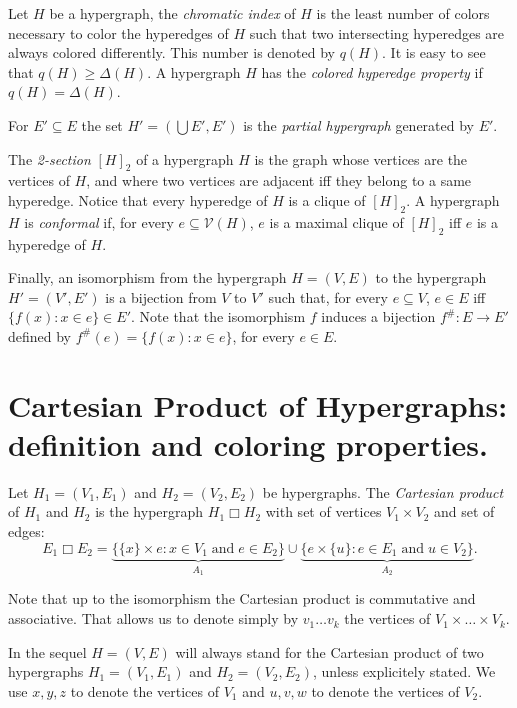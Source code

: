 \documentclass[copyright]{eptcs}
\newcommand{\mc}[1]{\mathcal{#1}}
\newcommand{\suppr}[1]{}
\begin{document}
Let $H$ be a hypergraph, the \emph{chromatic index} of $H$ is the least number of colors necessary to color the hyperedges of $H$ such that two intersecting hyperedges are always colored differently. This number is denoted by $q(H)$. It is easy to see that $q(H) \geq \Delta(H)$. A hypergraph $H$ has the \emph{colored hyperedge property} if  $q(H) = \Delta(H)$.

For $E'\subseteq E$ the set $H'= (\bigcup E' , E')$ is the \emph{partial hypergraph} generated by $E'$. 

The \emph{2-section} $[H]_2$ of a hypergraph $H$ is the graph
whose vertices are the vertices of $H$, and where two vertices are
adjacent iff they belong to a same hyperedge. Notice that every
hyperedge of $H$ is a clique of $[H]_2$. A hypergraph $H$ is
\emph{conformal} if, for every $e\subseteq \mc V(H)$, $e$ is a
maximal clique of $[H]_2$ iff $e$ is a hyperedge of $H$.

Finally, an isomorphism from the hypergraph $H=(V,E)$ to the
hypergraph $H'=(V',E')$ is a bijection from $V$ to $V'$ such that,
for every $e \subseteq V$, $e \in E$ iff $\{f(x) : x \in e\} \in
E'$. Note that the isomorphism $f$ induces a bijection $f^{\#} : E
\rightarrow E'$ defined by $f^{\#}(e) = \{f(x) : x \in e\}$, for
every $e\in E$.

\section{Cartesian Product of  Hypergraphs: definition and coloring properties.}

Let $H_1=(V_1, E_1)$ and  $H_2=(V_2, E_2)$
be hypergraphs. The \emph{Cartesian product} of $H_1$ and $H_2$ is the hypergraph $H_1 \Box H_2$ with set of vertices
$V_1 \times V_2$ and set of edges:
\[
 E_1\Box E_2= \underbrace{\{ \{x\}\times e : x\in V_1 \;\mbox{and}\;  e\in E_2\}}_{A_{1}} \cup\underbrace{ \{e\times
 \{u\}: e\in E_1 \; \mbox{and}\;  u\in V_2\}}_{A_{2}}.
\]

Note that up to the isomorphism the Cartesian product is
commutative and associative. That allows us to denote simply by
$v_1 \ldots v_k$ the vertices of $V_1 \times \ldots \times V_k$.
\suppr{SE REPETE AVEC LA PREUVE DU LEMME Note also that a
hyperedge $\{x\} \times e$ of $A_1$ and a hyperedge $e' \times
\{u\}$ of $A_2$ have a non-empty intersection iff $x \in e'$ and
$u\in e$. In that case $\{x\} \times e \cap e' \times \{u\}=
\{xu\}$.}


In the sequel $H=(V,E)$ will always stand for the Cartesian product of two hypergraphs $H_1 = (V_1,E_1)$ and $H_2 = (V_2,E_2)$, unless explicitely stated. We use $x,y,z$ to denote the vertices of $V_1$ and $u,v,w$ to denote the vertices of $V_2$.
\end{document}
